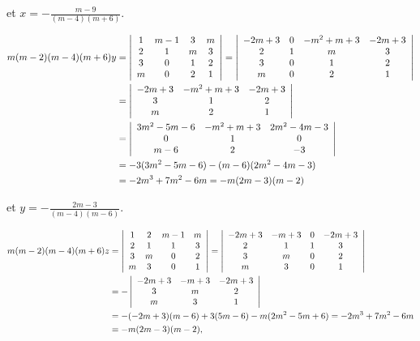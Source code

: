 {{et $x=-\frac{m-9}{(m-4)(m+6)}$.

\begin{align*}\ensuremath
m(m-2)(m-4)(m+6)y&=\left|
\begin{array}{cccc}
1&m-1&3&m\\
2&1&m&3\\
3&0&1&2\\
m&0&2&1
\end{array}\right|=\left|
\begin{array}{cccc}
-2m+3&0&-m^2+m+3&-2m+3\\
2&1&m&3\\
3&0&1&2\\
m&0&2&1
\end{array}\right|\\
 &=\left|
\begin{array}{ccc}
-2m+3&-m^2+m+3&-2m+3\\
3&1&2\\
m&2&1
\end{array}\right|\\
 &=\left|
\begin{array}{ccc}
3m^2-5m-6&-m^2+m+3&2m^2-4m-3\\
0&1&0\\
m-6&2&-3
\end{array}\right|\\
 &=-3(3m^2-5m-6)-(m-6)(2m^2-4m-3)\\
 &=-2m^3+7m^2-6m=-m(2m-3)(m-2)
\end{align*}

et $y=-\frac{2m-3}{(m-4)(m-6)}$.

\begin{align*}\ensuremath
m(m-2)(m-4)(m+6)z&=\left|
\begin{array}{cccc}
1&2&m-1&m\\
2&1&1&3\\
3&m&0&2\\
m&3&0&1
\end{array}\right|=\left|
\begin{array}{cccc}
-2m+3&-m+3&0&-2m+3\\
2&1&1&3\\
3&m&0&2\\
m&3&0&1
\end{array}\right|\\
 &=-\left|
\begin{array}{ccc}
-2m+3&-m+3&-2m+3\\
3&m&2\\
m&3&1
\end{array}\right|\\
 &=-(-2m+3)(m-6)+3(5m-6)-m(2m^2-5m+6)=-2m^3+7m^2-6m\\
 &=-m(2m-3)(m-2),
\end{align*}

}}
